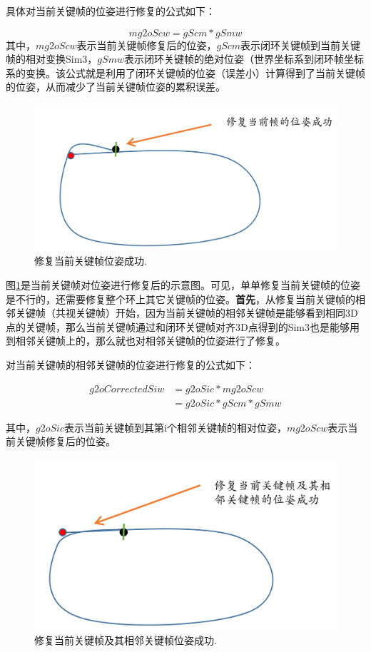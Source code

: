 具体对当前关键帧的位姿进行修复的公式如下：

\begin{equation}
	mg2oScw = gScm * gSmw
\end{equation}
其中，$mg2oScw$表示当前关键帧修复后的位姿，$gScm$表示闭环关键帧到当前关键帧的相对变换Sim3，$gSmw$表示闭环关键帧的绝对位姿（世界坐标系到闭环帧坐标系的变换。该公式就是利用了闭环关键帧的位姿（误差小）计算得到了当前关键帧的位姿，从而减少了当前关键帧位姿的累积误差。


\begin{figure}[h]%
	\centering  %
	\includegraphics[width=0.5\linewidth]{image/ORB-SLAM/LoopFix1.png}  %
	\caption{修复当前关键帧位姿成功.}  %
	\label{fig:loop_fix1}   %
\end{figure}


图\ref{fig:loop_fix1}是当前关键帧对位姿进行修复后的示意图。可见，单单修复当前关键帧的位姿是不行的，还需要修复整个环上其它关键帧的位姿。\textbf{首先}，从修复当前关键帧的相邻关键帧（共视关键帧）开始，因为当前关键帧的相邻关键帧是能够看到相同3D点的关键帧，那么当前关键帧通过和闭环关键帧对齐3D点得到的Sim3也是能够用到相邻关键帧上的，那么就也对相邻关键帧的位姿进行了修复。



对当前关键帧的相邻关键帧的位姿进行修复的公式如下：


\begin{equation}
\begin{split}
g2oCorrectedSiw& = g2oSic * mg2oScw \\
&=  g2oSic * gScm * gSmw
\end{split}
\end{equation}

其中，$g2oSic$表示当前关键帧到其第i个相邻关键帧的相对位姿，$mg2oScw$表示当前关键帧修复后的位姿。




\begin{figure}[h]%
	\centering  %
	\includegraphics[width=0.5\linewidth]{image/ORB-SLAM/LoopFix2.png}  %
	\caption{修复当前关键帧及其相邻关键帧位姿成功.}  %
	\label{fig:loop_fix2}   %
\end{figure}



